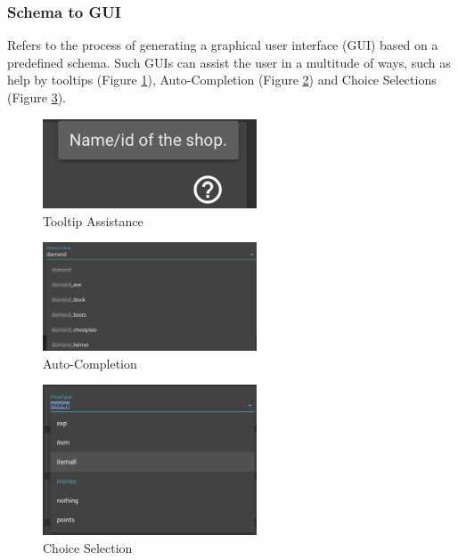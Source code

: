 \documentclass[lettersize,journal]{IEEEtran}
\begin{document}


\subsubsection{Schema to GUI}
Refers to the process of generating a graphical user interface (GUI) based on a predefined schema. Such GUIs can assist the user in a multitude of ways, such as help by tooltips (Figure \ref{gui_advantage_tooltip}), Auto-Completion (Figure \ref{gui_advantage_autocomplete}) and Choice Selections (Figure \ref{gui_advantage_choiceselection}).

\begin{figure}[!t]
\centering
\includegraphics[width=2.5in]{gui_advantage_tooltip.png}
\caption{Tooltip Assistance}
\label{gui_advantage_tooltip}
\end{figure}

\begin{figure}[!t]
\centering
\includegraphics[width=2.5in]{gui_advantage_autocomplete.png}
\caption{Auto-Completion}
\label{gui_advantage_autocomplete}
\end{figure}

\begin{figure}[!t]
\centering
\includegraphics[width=2.5in]{gui_advantage_choiceselection.png}
\caption{Choice Selection}
\label{gui_advantage_choiceselection}
\end{figure}
\end{document}
